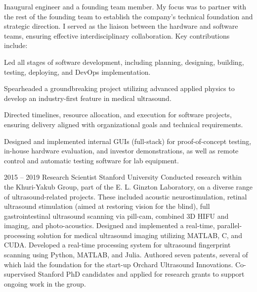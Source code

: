 \documentclass[8pt]{mofiicv}
\begin{document}
\begin{minipage}[T]{\SecondColumnWidth}
\begin{entrylist}
{			Inaugural engineer and a founding team member. My focus was to partner with the rest of the founding team to establish the company's technical foundation and strategic direction. I served as the liaison between the hardware and software teams, ensuring effective interdisciplinary collaboration. 
			Key contributions include:
			\begin{description}[noitemsep,font=\normalfont\itshape]
				\item[Software Development Leadership] Led all stages of software development, including planning, designing, building, testing, deploying, and DevOps implementation.
				\item[Nonlinear Signal Processing] Spearheaded a groundbreaking project utilizing advanced applied physics to develop an industry-first feature in medical ultrasound. 
				\item[Strategic Project Management]  Directed timelines, resource allocation, and execution for software projects, ensuring delivery aligned with organizational goals and technical requirements.
				\item[Innovative Software Solutions] Designed and implemented internal GUIs (full-stack) for proof-of-concept testing, in-house hardware evaluation, and investor demonstrations, as well as remote control and automatic testing software for lab equipment.
			\end{description}\vspace*{-0.9em}
			}
		\entry
			{2015 -- 2019}
			{Research Scientist}
			{Stanford University}
			{
			Conducted research within the Khuri-Yakub Group, part of the E. L. Ginzton Laboratory, on a diverse range of ultrasound-related projects. These included acoustic neurostimulation, retinal ultrasound stimulation (aimed at restoring vision for the blind), full gastrointestinal ultrasound scanning via pill-cam, combined 3D HIFU and imaging, and photo-acoustics. Designed and implemented a real-time, parallel-processing solution for medical ultrasound imaging utilizing MATLAB, C, and CUDA. Developed a real-time processing system for ultrasound fingerprint scanning using Python, MATLAB, and Julia. Authored seven patents, several of which laid the foundation for the start-up Orchard Ultrasound Innovations. Co-supervised Stanford PhD candidates and applied for research grants to support ongoing work in the group.\\ 
			}

\end{entrylist}
\end{minipage}
\end{document}
